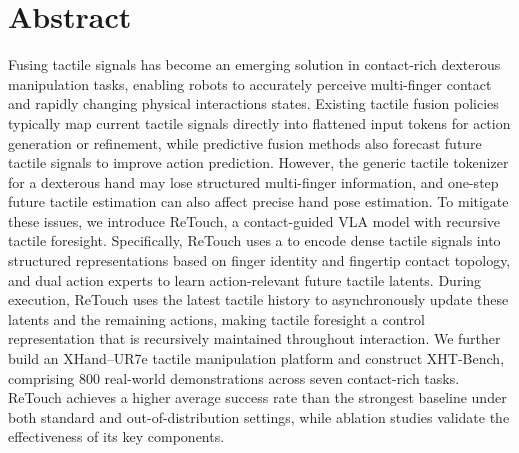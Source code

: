 \section{Abstract}


Fusing tactile signals has become an emerging solution in contact-rich dexterous manipulation tasks, enabling robots to accurately perceive multi-finger contact and rapidly changing physical interactions states. Existing tactile fusion policies typically map current tactile signals directly into flattened input tokens for action generation or refinement, while predictive fusion methods also forecast future tactile signals to improve action prediction. However, the generic tactile tokenizer for a dexterous hand may lose structured multi-finger information, and one-step future tactile estimation can also affect precise hand pose estimation.
To mitigate these issues, we introduce ReTouch, a contact-guided VLA model with recursive tactile foresight. Specifically, ReTouch uses a \Encoder to encode dense tactile signals into structured representations based on finger identity and fingertip contact topology, and dual action experts to learn action-relevant future tactile latents. During execution, ReTouch uses the latest tactile history to asynchronously update these latents and the remaining actions, making tactile foresight a control representation that is recursively maintained throughout interaction. We further build an XHand--UR7e tactile manipulation platform and construct XHT-Bench, comprising 800 real-world demonstrations across seven contact-rich tasks. ReTouch achieves a higher average success rate than the strongest baseline under both standard and out-of-distribution settings, while ablation studies validate the effectiveness of its key components.